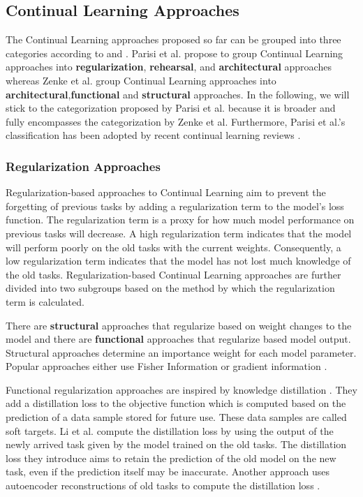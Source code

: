 \subsection{Continual Learning Approaches}
\label{sec:ContinualLearningApproaches}
The Continual Learning approaches proposed so far can be grouped into three categories according to \cite{parisi2019continual} \cite{mundt2020wholistic} and \cite{zenke2017continual}.
Parisi et al. \cite{parisi2019continual} propose to group Continual Learning approaches into \textbf{regularization}, \textbf{rehearsal}, and \textbf{architectural} approaches whereas Zenke et al.
\cite{zenke2017continual} group Continual Learning approaches into \textbf{architectural},\textbf{functional} and \textbf{structural} approaches. In the following, we will stick to the
categorization proposed by Parisi et al. because it is broader and fully encompasses the categorization by Zenke et al. Furthermore, Parisi et al.'s classification has been adopted by
recent continual learning reviews \cite{mundt2020wholistic}.

\subsubsection{Regularization Approaches}
\label{sec:RegularizationApproaches}
Regularization-based approaches to Continual Learning aim to prevent the forgetting of previous tasks by adding a regularization term to
the model's loss function. The regularization term is a proxy for how much model performance on previous tasks will decrease. A high
regularization term indicates that the model will perform poorly on the old tasks with the current weights. Consequently, a low regularization
term indicates that the model has not lost much knowledge of the old tasks. Regularization-based Continual Learning approaches are further
divided into two subgroups based on the method by which the regularization term is calculated. \par
There are \textbf{structural} approaches that regularize based on weight changes to the model and there are \textbf{functional}
approaches that regularize based model output. Structural approaches determine an importance weight for each
model parameter. Popular approaches either use Fisher Information \cite{kirkpatrick2017overcoming} \cite{lee2017overcoming} or
gradient information \cite{aljundi2018memory} \cite{zenke2017continual}.\par
Functional regularization approaches are inspired by knowledge distillation \cite{hinton2015distilling}. They add a distillation
loss to the objective function which is computed based on the prediction of a data sample stored for future use. These data samples
are called soft targets. Li et al. \cite{li2017learning} compute the distillation loss by using the output of the newly arrived task
given by the model trained on the old tasks. The distillation loss they introduce aims to retain the prediction of the old model on
the new task, even if the prediction itself may be inaccurate. Another approach uses autoencoder reconstructions of old tasks to
compute the distillation loss \cite{rannen2017encoder}.

